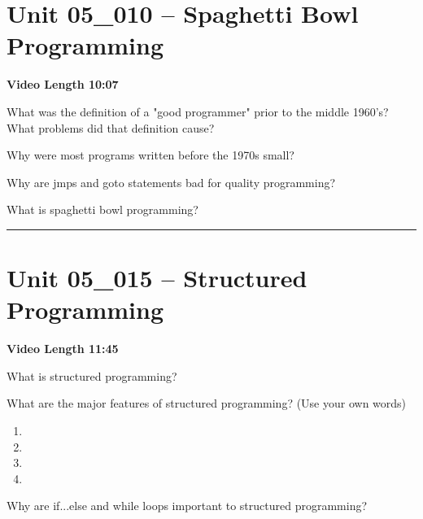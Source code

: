 \documentclass[letterpaper,12pt]{exam}
\newcommand{\unit}{Unit 05}
\begin{document}

\section*{\unit\_010 -- Spaghetti Bowl Programming}
\par{\selectfont\textbf{Video Length 10:07}}
\begin{questions}

\begin{samepage}
    \question What was the definition of a "good programmer" prior to the middle 1960's? What problems did that definition cause?
    \vspace{5mm}
\end{samepage}

\begin{samepage}
    \question Why were most programs written before the 1970s small?
    \vspace{5mm}
\end{samepage}
\par
 \begin{samepage}
     \question Why are jmps and goto statements bad for quality programming?
     \vspace{5mm}
 \end{samepage}
 \par
  \begin{samepage}
      \question What is spaghetti bowl programming?
      \vspace{5mm}
  \end{samepage}
  \par
  \rule{0.5\textwidth}{.4pt} %

\section*{\unit\_015 -- Structured Programming}
\par{\selectfont\textbf{Video Length 11:45}}
\begin{samepage}
    \question What is structured programming?
    \vspace{5mm}
\end{samepage}
\par
What are the major features of structured programming? (Use your own words)
\begin{enumerate}
    \item
    \vspace{5mm}
    \item
    \vspace{5mm}
    \item
    \vspace{5mm}
    \item
\end{enumerate}
\begin{samepage}
    \question Why are if...else and while loops important to structured programming?
    \vspace{5mm}
\end{samepage}
\par
 

\end{questions}
\end{document}
